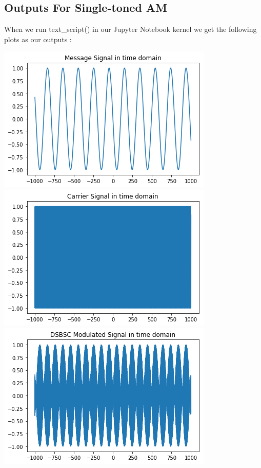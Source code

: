 \documentclass[12pt,a4paper]{article}%
\begin{document}
\begin{flushleft}
		\subsection{Outputs For Single-toned AM}
	    \begin{flushleft}
	    		When we run text\_script() in our Jupyter Notebook kernel we get the following plots as our outputs :
	    \end{flushleft}
		\begin{center}
			{\includegraphics[width=0.80 \textwidth]{./images/m_sig.PNG}}\\\bigskip
			{\includegraphics[width=0.80 \textwidth]{./images/c_sig.PNG}}
			{\includegraphics[width=0.80 \textwidth]{./images/modu_sig.PNG}}\\\bigskip

\end{center}
\end{flushleft}
\end{document}
